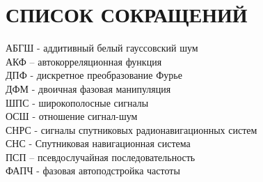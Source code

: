 \section*{СПИСОК СОКРАЩЕНИЙ}
АБГШ - аддитивный белый гауссовский шум				\\
АКФ – автокорреляционная функция				\\
ДПФ - дискретное преобразование Фурье				\\
ДФМ - двоичная фазовая манипуляция				\\
ШПС -  широкополосные сигналы 					\\
ОСШ - отношение сигнал-шум 					\\
СНРС - сигналы спутниковых радионавигационных систем		\\
СНС - Спутниковая навигационная система				\\
ПСП – псевдослучайная последовательность			\\
ФАПЧ - фазовая автоподстройка частоты				\\
\newpage
